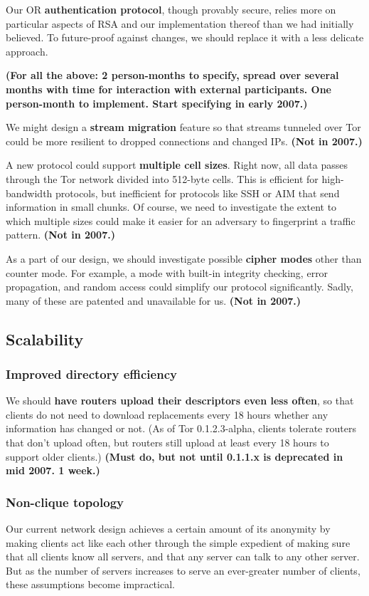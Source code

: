 \documentclass{article}
\newcommand{\plan}[1]{ {\bf (#1)}}
\begin{document}
Our OR {\bf authentication protocol}, though provably
secure\cite{tap:pet2006}, relies more on particular aspects of RSA and our
implementation thereof than we had initially believed.  To future-proof
against changes, we should replace it with a less delicate approach.

\plan{For all the above: 2 person-months to specify, spread over several
  months with time for interaction with external participants.  One
  person-month to implement.  Start specifying in early 2007.}

We might design a {\bf stream migration} feature so that streams tunneled
over Tor could be more resilient to dropped connections and changed IPs.
\plan{Not in 2007.}

A new protocol could support {\bf multiple cell sizes}.  Right now, all data
passes through the Tor network divided into 512-byte cells.  This is
efficient for high-bandwidth protocols, but inefficient for protocols
like SSH or AIM that send information in small chunks.  Of course, we need to
investigate the extent to which multiple sizes could make it easier for an
adversary to fingerprint a traffic pattern. \plan{Not in 2007.}

As a part of our design, we should investigate possible {\bf cipher modes}
other than counter mode.  For example, a mode with built-in integrity
checking, error propagation, and random access could simplify our protocol
significantly.  Sadly, many of these are patented and unavailable for us.
\plan{Not in 2007.}

\subsection{Scalability}

\subsubsection{Improved directory efficiency}

We should {\bf have routers upload their descriptors even less often}, so
that clients do not need to download replacements every 18 hours whether any
information has changed or not.  (As of Tor 0.1.2.3-alpha, clients tolerate
routers that don't upload often, but routers still upload at least every 18
hours to support older clients.) \plan{Must do, but not until 0.1.1.x is
deprecated in mid 2007. 1 week.}

\subsubsection{Non-clique topology}
Our current network design achieves a certain amount of its anonymity by
making clients act like each other through the simple expedient of making
sure that all clients know all servers, and that any server can talk to any
other server.  But as the number of servers increases to serve an
ever-greater number of clients, these assumptions become impractical.
\end{document}
